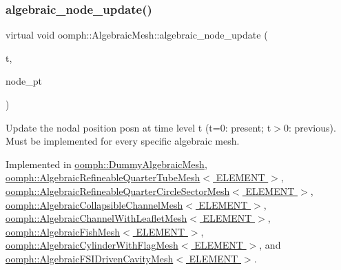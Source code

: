 \mbox{\label{classoomph_1_1AlgebraicMesh_ab01d6f93354f3c4e5c9d1f0a5885a65b}} 
\subsubsection{\texorpdfstring{algebraic\+\_\+node\+\_\+update()}{algebraic\_node\_update()}}
{\footnotesize\ttfamily virtual void oomph\+::\+Algebraic\+Mesh\+::algebraic\+\_\+node\+\_\+update (\begin{DoxyParamCaption}\item[{const unsigned \&}]{t,  }\item[{\hyperlink{classoomph_1_1AlgebraicNode}{Algebraic\+Node} $\ast$\&}]{node\+\_\+pt }\end{DoxyParamCaption})\hspace{0.3cm}{\ttfamily [pure virtual]}}



Update the nodal position posn at time level t (t=0\+: present; t$>$0\+: previous). Must be implemented for every specific algebraic mesh. 



Implemented in \hyperlink{classoomph_1_1DummyAlgebraicMesh_ae13a52cb8561a07233851e2d1db7b4e4}{oomph\+::\+Dummy\+Algebraic\+Mesh}, \hyperlink{classoomph_1_1AlgebraicRefineableQuarterTubeMesh_af98a0aaff29c54ffa35f72f7dcf6b8c7}{oomph\+::\+Algebraic\+Refineable\+Quarter\+Tube\+Mesh$<$ E\+L\+E\+M\+E\+N\+T $>$}, \hyperlink{classoomph_1_1AlgebraicRefineableQuarterCircleSectorMesh_ac591df8f18ad687e1dc9b70b731c2de1}{oomph\+::\+Algebraic\+Refineable\+Quarter\+Circle\+Sector\+Mesh$<$ E\+L\+E\+M\+E\+N\+T $>$}, \hyperlink{classoomph_1_1AlgebraicCollapsibleChannelMesh_ae1ea6d9baa12e2ca87d21d4370f41870}{oomph\+::\+Algebraic\+Collapsible\+Channel\+Mesh$<$ E\+L\+E\+M\+E\+N\+T $>$}, \hyperlink{classoomph_1_1AlgebraicChannelWithLeafletMesh_a4c01b99ca83286f872c517fc5269a890}{oomph\+::\+Algebraic\+Channel\+With\+Leaflet\+Mesh$<$ E\+L\+E\+M\+E\+N\+T $>$}, \hyperlink{classoomph_1_1AlgebraicFishMesh_ac66d6542472dac702a7414aa9d7f995f}{oomph\+::\+Algebraic\+Fish\+Mesh$<$ E\+L\+E\+M\+E\+N\+T $>$}, \hyperlink{classoomph_1_1AlgebraicCylinderWithFlagMesh_a5e1e770e82577e5702470d8b87f8599d}{oomph\+::\+Algebraic\+Cylinder\+With\+Flag\+Mesh$<$ E\+L\+E\+M\+E\+N\+T $>$}, and \hyperlink{classoomph_1_1AlgebraicFSIDrivenCavityMesh_a56c72b78935e84f7fef3f6b5d85556c3}{oomph\+::\+Algebraic\+F\+S\+I\+Driven\+Cavity\+Mesh$<$ E\+L\+E\+M\+E\+N\+T $>$}.



